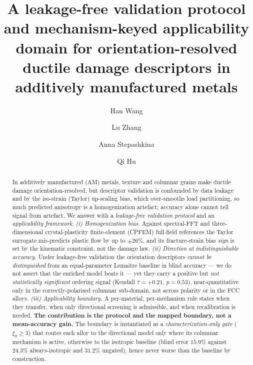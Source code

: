 \begin{frontmatter}

\title{A leakage-free validation protocol and mechanism-keyed applicability domain for orientation-resolved ductile damage descriptors in additively manufactured metals}

\author[zzlab]{Han Wang}
\author[zzlab]{Lu Zhang}
\author[zzlab]{Anna Stepashkina}
\author[sjtu]{Qi Hu}




\begin{abstract}

In additively manufactured (AM) metals, texture and columnar grains make ductile damage orientation-resolved, but descriptor validation is confounded by data leakage and by the iso-strain (Taylor) up-scaling bias, which over-smooths load partitioning, so much predicted anisotropy is a homogenization artefact; accuracy alone cannot tell signal from artefact. We answer with a \emph{leakage-free validation protocol} and an \emph{applicability framework}. \emph{(i) Homogenization bias.} Against spectral-FFT and three-dimensional crystal-plasticity finite-element (CPFEM) full-field references the Taylor surrogate mis-predicts plastic flow by up to $\pm26\%$, and its fracture-strain bias \emph{sign} is set by the kinematic constraint, not the damage law. \emph{(ii) Direction at indistinguishable accuracy.} Under leakage-free validation the orientation descriptors \emph{cannot be distinguished} from an equal-parameter Lemaitre baseline in blind accuracy --- we do not assert that the enriched model beats it --- yet they carry a positive but \emph{not statistically significant} ordering signal (Kendall $\bar\tau=+0.21$, $p=0.53$), near-quantitative only in the correctly-polarised columnar sub-domain, not across polarity or in the FCC alloys. \emph{(iii) Applicability boundary.} A per-material, per-mechanism rule states when they transfer, when only directional screening is admissible, and when recalibration is needed. \textbf{The contribution is the protocol and the mapped boundary, not a mean-accuracy gain.} The boundary is instantiated as a \emph{characterization-only gate} ($\xi_0\ge3$) that routes each alloy to the directional model only where its columnar mechanism is active, otherwise to the isotropic baseline (blind error $15.9\%$ against $24.3\%$ always-isotropic and $31.2\%$ ungated), hence never worse than the baseline by construction.
\end{abstract}


\end{frontmatter}
